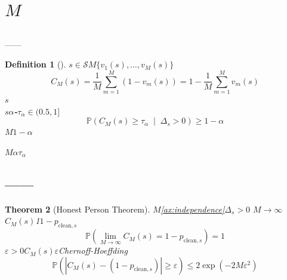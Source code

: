 \documentclass[11pt,a4paper]{article}
\newtheorem{theorem}{Theorem}[section]
\newtheorem{definition}[theorem]{Definition}
\theoremstyle{remark}
\begin{document}
\section{$M$}

\subsection{}

\textbf{}
——\textbf{}

\begin{definition}[]
\label{def:consensus}
$s \in \mathcal{S}$$M$$\{v_1(s), \ldots, v_M(s)\}$
\textbf{}
\begin{equation}
    C_M(s) = \frac{1}{M}\sum_{m=1}^{M} (1 - v_m(s)) = 1 - \frac{1}{M}\sum_{m=1}^{M} v_m(s)
\end{equation}
$s$\\
$s$\textbf{$\alpha$-}$\tau_\alpha \in (0.5, 1]$
\begin{equation}
    \boxed{\mathbb{P}\left(C_M(s) \geq \tau_\alpha \;\middle|\; \Delta_s > 0\right) \geq 1 - \alpha} 
\end{equation}
\textbf{}$M$$1-\alpha$
\end{definition}

$M$$\alpha$$\tau_\alpha$

\subsection{——}

\begin{theorem}[Honest Person Theorem]
\label{thm:honest_person}
$M$\ref{ax:independence}$\Delta_s > 0$
$M \to \infty$$C_M(s)$1$1 - p_{\text{clean}, s}$
\begin{equation}
    \boxed{\mathbb{P}\left(\lim_{M \to \infty} C_M(s) = 1 - p_{\text{clean}, s}\right) = 1} 
\end{equation}
$\varepsilon > 0$$C_M(s)$$\varepsilon$Chernoff-Hoeffding
\begin{equation}
    \boxed{\mathbb{P}\left(|C_M(s) - (1-p_{\text{clean}, s})| \geq \varepsilon\right)
    \leq 2\exp\left(-2M\varepsilon^2\right)} 
\end{equation}
\end{theorem}
\end{document}

